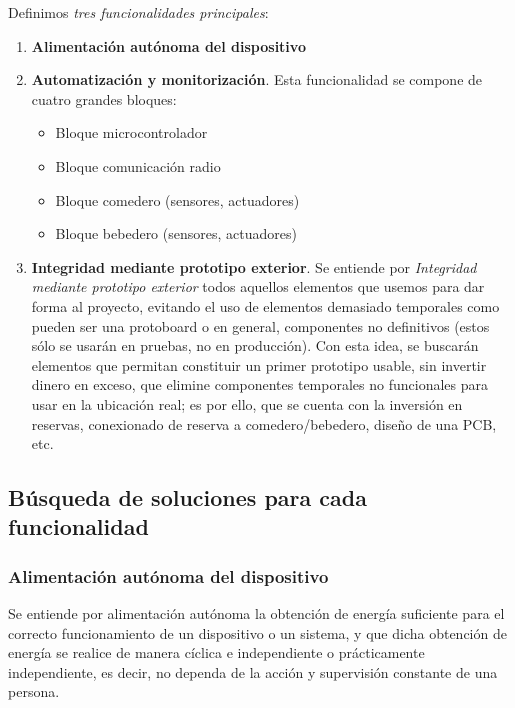 \documentclass[12pt]{article}
\begin{document}
	\noindent Definimos \textit{tres funcionalidades principales}: 
	
	\begin{enumerate}
		\item \textbf{Alimentación autónoma del dispositivo}
		\item \textbf{Automatización y monitorización}. Esta funcionalidad se compone de cuatro grandes bloques:
		\begin{itemize}
			\item Bloque microcontrolador
			\item Bloque comunicación radio 
			\item Bloque comedero (sensores, actuadores)
			\item Bloque bebedero (sensores, actuadores)
		\end{itemize}
	
		\item \textbf{Integridad mediante prototipo exterior}. Se entiende por \textit{Integridad mediante prototipo exterior} todos aquellos elementos que usemos para dar forma al proyecto, evitando el uso de elementos demasiado temporales como pueden ser una protoboard o en general, componentes no definitivos (estos sólo se usarán en pruebas, no en producción). Con esta  idea, se buscarán elementos que permitan constituir un primer prototipo usable, sin invertir dinero en exceso, que elimine componentes temporales no funcionales para usar en la ubicación real; es por ello, que se cuenta con la inversión en reservas, conexionado de reserva a comedero/bebedero, diseño de una PCB, etc.
	\end{enumerate}
	
	\subsection[Búsqueda soluciones]{Búsqueda de soluciones para cada funcionalidad}

	\subsubsection{Alimentación autónoma del dispositivo}
	\label{subseccion 3.2.1: búsqueda soluciones alimentación}
	\noindent Se entiende por alimentación autónoma la obtención de energía suficiente para el correcto funcionamiento de un dispositivo o un sistema, y que dicha obtención de energía se realice de manera cíclica e independiente o prácticamente independiente, es decir, no dependa de la acción y supervisión constante de una persona. \\
	
\end{document}
